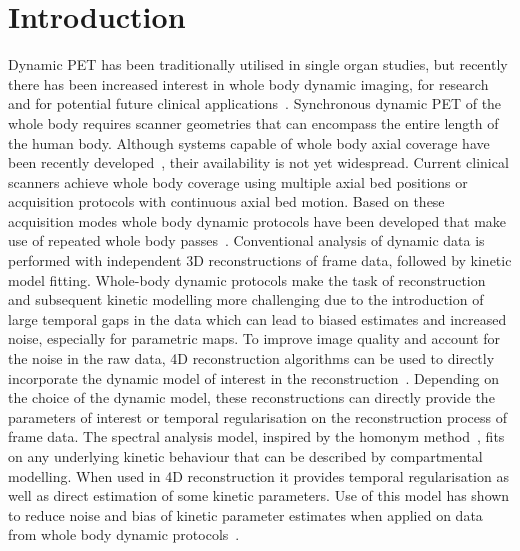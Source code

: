 


\section{Introduction}
Dynamic PET has been traditionally utilised in single organ studies, but recently there has been increased interest in whole body dynamic imaging, for research and for potential future clinical applications~\cite{Lammertsma2017,Leahy2018,Rahmim2019,Fahrni2019}. Synchronous dynamic PET of the whole body requires scanner geometries that can encompass the entire length of the human body. Although systems capable of whole body axial coverage have been recently developed~\cite{Cherry2017}, their availability is not yet widespread. Current clinical scanners achieve whole body coverage using multiple axial bed positions or acquisition protocols with continuous axial bed motion. Based on these acquisition modes whole body dynamic protocols have been developed that make use of repeated whole body passes~\cite{Karakatsanis2013}. 
Conventional analysis of dynamic data is performed with independent 3D reconstructions of frame data, followed by kinetic model fitting. Whole-body dynamic protocols make the task of reconstruction and subsequent kinetic modelling more challenging due to the introduction of large temporal gaps in the data which can lead to biased estimates and increased noise, especially for parametric maps. 
To improve image quality and account for the noise in the raw data, 4D reconstruction algorithms can be used to directly incorporate the dynamic model of interest in the reconstruction~\cite{Reader2014}.
Depending on the choice of the dynamic model, these reconstructions can directly provide the parameters of interest or temporal regularisation on the reconstruction process of frame data. The spectral analysis model, inspired by the homonym method~\cite{Cunningham1993}, fits on any underlying kinetic behaviour that can be described by compartmental modelling. When used in 4D reconstruction it provides temporal regularisation as well as direct estimation of some kinetic parameters. Use of this model has shown to reduce noise and bias of kinetic parameter estimates when applied on data from whole body dynamic protocols~\cite{Chalampalakis2019}.

